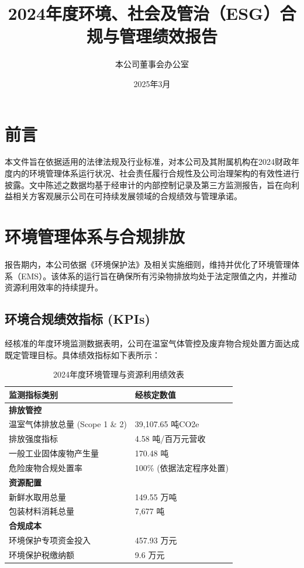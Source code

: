 \documentclass[a4paper,12pt]{article}
\title{\textbf{2024年度环境、社会及管治（ESG）合规与管理绩效报告}}
\author{本公司董事会办公室}
\date{2025年3月}
\begin{document}
\maketitle

\section*{前言}

本文件旨在依据适用的法律法规及行业标准，对本公司及其附属机构在2024财政年度内的环境管理体系运行状况、社会责任履行合规性及公司治理架构的有效性进行披露。文中陈述之数据均基于经审计的内部控制记录及第三方监测报告，旨在向利益相关方客观展示公司在可持续发展领域的合规绩效与管理承诺。

\section{环境管理体系与合规排放}

报告期内，本公司依据《环境保护法》及相关实施细则，维持并优化了环境管理体系（EMS）。该体系的运行旨在确保所有污染物排放均处于法定限值之内，并推动资源利用效率的持续提升。

\subsection{环境合规绩效指标 (KPIs)}

经核准的年度环境监测数据表明，公司在温室气体管控及废弃物合规处置方面达成既定管理目标。具体绩效指标如下表所示：

\begin{table}[H]
\centering
\caption{2024年度环境管理与资源利用绩效表}
\begin{tabular}{@{}ll@{}}
\toprule
\textbf{监测指标类别} & \textbf{经核定数值} \\ \midrule
\textbf{排放管控} & \\
温室气体排放总量 (Scope 1 \& 2) & 39,107.65 吨CO2e \\
排放强度指标 & 4.58 吨/百万元营收 \\
一般工业固体废物产生量 & 170.48 吨 \\
危险废物合规处置率 & 100\% (依据法定程序处置) \\
\midrule
\textbf{资源配置} & \\
新鲜水取用总量 & 149.55 万吨 \\
包装材料消耗总量 & 7,677 吨 \\
\midrule
\textbf{合规成本} & \\
环境保护专项资金投入 & 457.93 万元 \\
环境保护税缴纳额 & 9.6 万元 \\ \bottomrule
\end{tabular}
\end{table}
\end{document}
